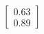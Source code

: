 \documentclass[preview]{standalone}
\begin{document}
\begin{align*}
\begin{bmatrix} 0.63 \\ 0.89 \end{bmatrix}
\end{align*}
\end{document}
